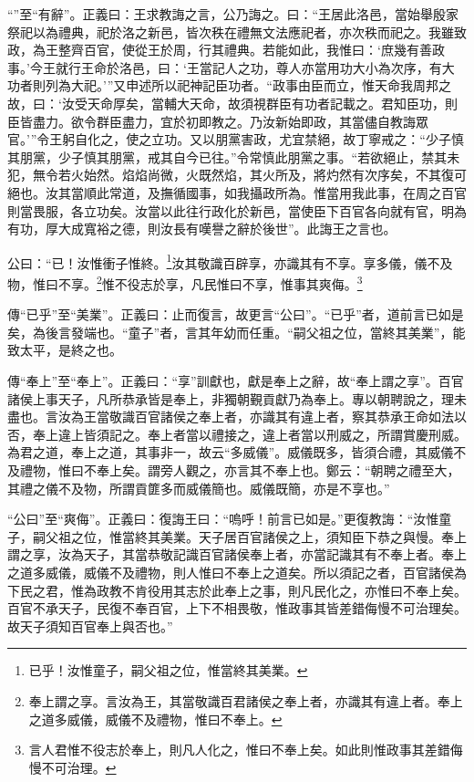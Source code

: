 {\noindent\shu{}\fzkt “”至“有辭”。正義曰：王求教誨之言，公乃誨之。曰：“王居此洛邑，當始舉殷家祭祀以為禮典，祀於洛之新邑，皆次秩在禮無文法應祀者，亦次秩而祀之。我雖致政，為王整齊百官，使從王於周，行其禮典。若能如此，我惟曰：‘庶幾有善政事。’今王就行王命於洛邑，曰：‘王當記人之功，尊人亦當用功大小為次序，有大功者則列為大祀。’”又申述所以祀神記臣功者。“政事由臣而立，惟天命我周邦之故，曰：‘汝受天命厚矣，當輔大天命，故須視群臣有功者記載之。君知臣功，則臣皆盡力。欲令群臣盡力，宜於初即教之。乃汝新始即政，其當儘自教誨眾官。’”令王躬自化之，使之立功。又以朋黨害政，尤宜禁絕，故丁寧戒之：“少子慎其朋黨，少子慎其朋黨，戒其自今已往。”令常慎此朋黨之事。“若欲絕止，禁其未犯，無令若火始然。焰焰尚微，火既然焰，其火所及，將灼然有次序矣，不其復可絕也。汝其當順此常道，及撫循國事，如我攝政所為。惟當用我此事，在周之百官則當畏服，各立功矣。汝當以此往行政化於新邑，當使臣下百官各向就有官，明為有功，厚大成寬裕之德，則汝長有嘆譽之辭於後世”。此誨王之言也。 \par}

公曰：“已！汝惟衝子惟終。\footnote{已乎！汝惟童子，嗣父祖之位，惟當終其美業。}汝其敬識百辟享，亦識其有不享。享多儀，儀不及物，惟曰不享。\footnote{奉上謂之享。言汝為王，其當敬識百君諸侯之奉上者，亦識其有違上者。奉上之道多威儀，威儀不及禮物，惟曰不奉上。}惟不役志於享，凡民惟曰不享，惟事其爽侮。\footnote{言人君惟不役志於奉上，則凡人化之，惟曰不奉上矣。如此則惟政事其差錯侮慢不可治理。}


{\noindent\zhuan{}\fzbyks 傳“已乎”至“美業”。正義曰：止而復言，故更言“公曰”。“已乎”者，道前言已如是矣，為後言發端也。“童子”者，言其年幼而任重。“嗣父祖之位，當終其美業”，能致太平，是終之也。 \par}

{\noindent\zhuan{}\fzbyks 傳“奉上”至“奉上”。正義曰：“享”訓獻也，獻是奉上之辭，故“奉上謂之享”。百官諸侯上事天子，凡所恭承皆是奉上，非獨朝覲貢獻乃為奉上。專以朝聘說之，理未盡也。言汝為王當敬識百官諸侯之奉上者，亦識其有違上者，察其恭承王命如法以否，奉上違上皆須記之。奉上者當以禮接之，違上者當以刑威之，所謂賞慶刑威。為君之道，奉上之道，其事非一，故云“多威儀”。威儀既多，皆須合禮，其威儀不及禮物，惟曰不奉上矣。謂旁人觀之，亦言其不奉上也。鄭云：“朝聘之禮至大，其禮之儀不及物，所謂貢篚多而威儀簡也。威儀既簡，亦是不享也。” \par}

{\noindent\shu{}\fzkt “公曰”至“爽侮”。正義曰：復誨王曰：“嗚呼！前言已如是。”更復教誨：“汝惟童子，嗣父祖之位，惟當終其美業。天子居百官諸侯之上，須知臣下恭之與慢。奉上謂之享，汝為天子，其當恭敬記識百官諸侯奉上者，亦當記識其有不奉上者。奉上之道多威儀，威儀不及禮物，則人惟曰不奉上之道矣。所以須記之者，百官諸侯為下民之君，惟為政教不肯役用其志於此奉上之事，則凡民化之，亦惟曰不奉上矣。百官不承天子，民復不奉百官，上下不相畏敬，惟政事其皆差錯侮慢不可治理矣。故天子須知百官奉上與否也。” \par}


